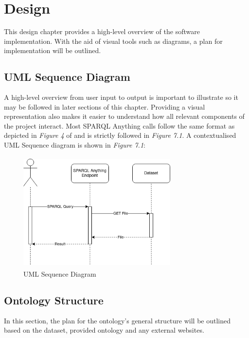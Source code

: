 \chapter{Design}
This design chapter provides a high-level overview of the software implementation. With the aid of visual tools such as diagrams, a plan for implementation will be outlined. 

\section{UML Sequence Diagram}
\hspace{0.5cm} A high-level overview from user input to output is important to illustrate so it may be followed in later sections of this chapter. Providing a visual representation also makes it easier to understand how all  relevant components of the project interact. Most SPARQL Anything calls follow the same format as depicted in \textit{Figure 4} of \cite{asprino2023knowledge} and is strictly followed in \textit{Figure 7.1}. A contextualised UML Sequence diagram is shown in \textit{Figure 7.1}: 

\begin{figure}
\begin{center}
    \includegraphics[width=8cm, height=6cm]{Images/UMLSequenceDiagram.drawio.png}
\end{center}
\vspace{-0.4cm}
\caption{UML Sequence Diagram}
\end{figure}

\section{Ontology Structure}
\hspace{0.5cm} In this section, the plan for the ontology's general structure will be outlined based on the dataset, provided ontology and any external websites. 

